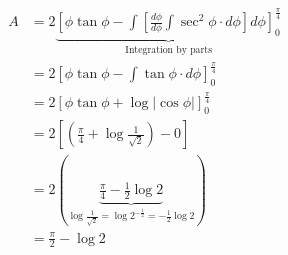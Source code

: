 \documentclass[14pt,fleqn]{extarticle}
\begin{document}
\newcard 

\begin{align}
A &= 2\underbrace{\left[ \phi\tan\phi-\int\left[\frac{d\phi}{d\phi}\int\sec^2\phi\cdot d\phi\right]d\phi\right]_0^{\frac\pi{4}}}_
{\text{Integration by parts}} \\
&= 2\left[ \phi\tan\phi - \int\tan\phi\cdot d\phi \right]_0^{\frac\pi{4}} \\
&= 2\left[ \phi\tan\phi + \log\vert\cos\phi\vert \right]_0^{\frac\pi{4}}  \\
&= 2\left[ \left( \frac\pi{4} + \log\frac{1}{\sqrt{2}}\right) - 0 \right] \\
&= 2\left( \underbrace{\frac\pi{4} -\frac{1}{2}\log 2}_{\log\frac{1}{\sqrt{2}} = \log 2^{-\frac{1}{2}} = -\frac{1}{2}\log 2}\right)\\
&= \frac\pi{2} - \log 2 
\end{align}
\end{document}
